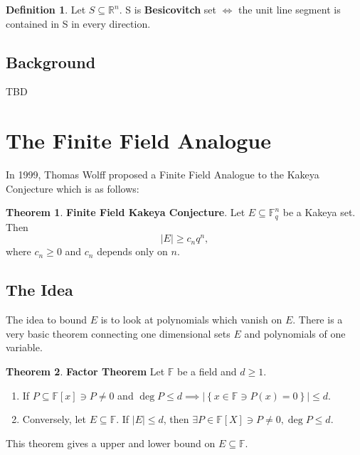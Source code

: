 \documentclass{article}
\newcommand*{\subeq}{\subseteq}
\newcommand{\R}{\mathbb{R}}
\newcommand{\F}{\mathbb{F}}
\newcommand{\abs}[1]{\left\lvert #1\right\rvert}
\theoremstyle{definition}
\newtheorem{definition}{Definition}[section]
\newtheorem{theorem}{Theorem}[section]
\begin{document}
\bigskip

\begin{definition}
    Let $S \subeq \R^n$. S is \textbf{Besicovitch} set $\iff$ the unit line segment is contained in S in every direction. 
\end{definition}

\bigskip

\subsection{Background}

TBD

\section{The Finite Field Analogue}

In 1999, Thomas Wolff proposed a Finite Field Analogue to the Kakeya Conjecture which is as follows: 

\begin{theorem}{\textbf{Finite Field Kakeya Conjecture}.}
    Let $E \subeq \F_q^n$ be a Kakeya set. Then \[\abs{E} \geq c_n q^n, \] where $c_n \geq 0$ and $c_n$ depends only on $n$.     
\end{theorem}

\subsection{The Idea}

The idea to bound $E$ is to look at polynomials which vanish on $E$. There is a very basic theorem connecting one dimensional sets $E$ and polynomials of one variable. 

\begin{theorem}{\textbf{Factor Theorem}}
    Let $\F$ be a field and $d \geq 1$. 

    \begin{enumerate}
        \item If $P \subeq \F[x] \ni P \neq 0$ and $\deg P \leq d \implies \abs{\left\{ x \in \F \ni P(x) = 0 \right\}} \leq d$. 
        \item Conversely, let $E \subeq \F$. If $\abs{E} \leq d$, then $\exists P \in \F[X] \ni P \neq 0, \deg P \leq d$.       
    \end{enumerate}
    
\end{theorem}

This theorem gives a upper and lower bound on $E \subeq \F$.
\end{document}
